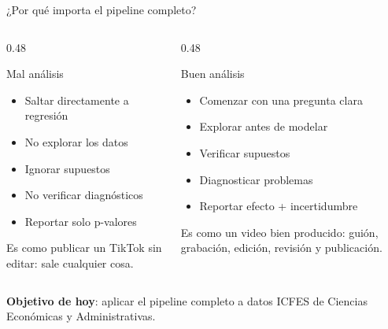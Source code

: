 \documentclass[aspectratio=169, 11pt]{beamer}
\begin{document}
\begin{frame}{¿Por qué importa el pipeline completo?}
\begin{columns}
\begin{column}{0.48\textwidth}
\begin{alertblock}{Mal an\'alisis}
\begin{itemize}
\item Saltar directamente a regresi\'on
\item No explorar los datos
\item Ignorar supuestos
\item No verificar diagn\'osticos
\item Reportar solo p-valores
\end{itemize}

\vspace{0.1cm}
\small
Es como publicar un TikTok sin editar: sale cualquier cosa.
\end{alertblock}
\end{column}

\begin{column}{0.48\textwidth}
\begin{exampleblock}{Buen an\'alisis}
\begin{itemize}
\item Comenzar con una pregunta clara
\item Explorar antes de modelar
\item Verificar supuestos
\item Diagnosticar problemas
\item Reportar efecto + incertidumbre
\end{itemize}

\vspace{0.1cm}
\small
Es como un video bien producido: gui\'on, grabaci\'on, edici\'on, revisi\'on y publicaci\'on.
\end{exampleblock}
\end{column}
\end{columns}

\vspace{0.3cm}
\begin{center}
\textbf{Objetivo de hoy}: aplicar el pipeline completo a datos ICFES de Ciencias Econ\'omicas y Administrativas.
\end{center}
\end{frame}
\end{document}
